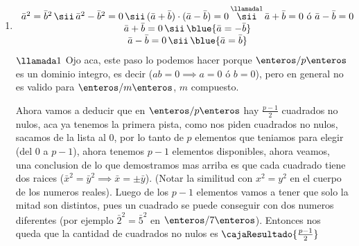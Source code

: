 \begin{enumerate}[label = \roman*)]
  \item
        $$
          \begin{array}{c}
            \bar{a}^2 = \bar{b}^2 \, \sii \, \bar{a}^2 - \bar{b}^2 = 0 \, \sii \, (\bar{a} + \bar{b}) \cdot (\bar{a} - \bar{b}) = 0 \, \overset{\llamada1}{\sii} \, \bar{a} + \bar{b} = 0 \text{ ó } \bar{a} - \bar{b} = 0 \\
            \bar{a} + \bar{b} = 0 \, \sii \, \blue{\bar{a} = -\bar{b}}                                                                                                                                                     \\
            \bar{a} - \bar{b} = 0 \, \sii \, \blue{\bar{a} = \bar{b}}
          \end{array}
        $$
        $\llamada1$ Ojo aca, este paso lo podemos hacer porque $\enteros/p\enteros$ es un dominio integro, es decir ($ab = 0 \implies a = 0 \text{ ó } b = 0$),
        pero en general no es valido para $\enteros/m\enteros$, $m$ compuesto.

        Ahora vamos a deducir que en $\enteros/p\enteros$ hay $\frac{p-1}{2}$ cuadrados no nulos, aca ya tenemos la primera pista, como
        nos piden cuadrados no nulos, sacamos de la lista al $0$, por lo tanto de $p$ elementos que teniamos para elegir (del $0$ a $p-1$), ahora tenemos $p-1$
        elementos disponibles, ahora veamos, una conclusion de lo que demostramos mas arriba es que cada cuadrado tiene dos raices ($\bar{x}^2 = \bar{y}^2 \implies \bar{x} = \pm \bar{y}$).
        (Notar la similitud con $x^2 = y^2$ en el cuerpo de los numeros reales).
        Luego de los $p-1$ elementos vamos a tener que solo la mitad son distintos, pues un cuadrado se puede conseguir con dos numeros diferentes (por ejemplo
        $\bar{2}^2 = \bar{5}^2$ en $\enteros/7\enteros$). Entonces nos queda que la cantidad de cuadrados no nulos es $\cajaResultado{\frac{p-1}{2}}$

\end{enumerate}

\begin{aportes}
  \item {}
\end{aportes}
